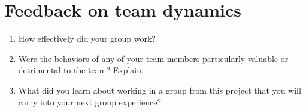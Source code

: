 \documentclass[a4paper, 12pt]{article}
\begin{document}
\begin{Form}
\begin{tabulary}{\linewidth}{|L|L|L|L|}
\hline
\end{tabulary}

\section*{Feedback on team dynamics}
\begin{enumerate}
 \item How effectively did your group work?\\
 \TextField[bordercolor=ISUGrey,name=effect,width=\textwidth,height=4cm,multiline,charsize=12pt]{}
 \item Were the behaviors of any of your team members particularly valuable or detrimental to the team? Explain.
 \\
 \TextField[bordercolor=ISUGrey,name=behaviors,width=\textwidth,height=4cm,multiline,charsize=12pt]{}
 \item What did you learn about working in a group from this project that you will carry into your next group experience?
 \\
 \TextField[bordercolor=ISUGrey,name=learn,width=\textwidth,height=4cm,multiline,charsize=12pt]{}
\end{enumerate}

\end{Form}
\end{document}
